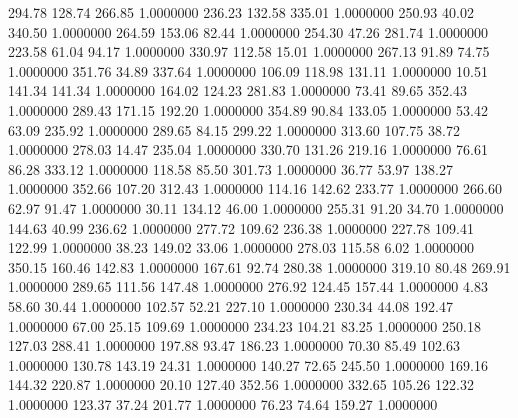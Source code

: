  294.78  128.74  266.85   1.0000000
 236.23  132.58  335.01   1.0000000
 250.93   40.02  340.50   1.0000000
 264.59  153.06   82.44   1.0000000
 254.30   47.26  281.74   1.0000000
 223.58   61.04   94.17   1.0000000
 330.97  112.58   15.01   1.0000000
 267.13   91.89   74.75   1.0000000
 351.76   34.89  337.64   1.0000000
 106.09  118.98  131.11   1.0000000
  10.51  141.34  141.34   1.0000000
 164.02  124.23  281.83   1.0000000
  73.41   89.65  352.43   1.0000000
 289.43  171.15  192.20   1.0000000
 354.89   90.84  133.05   1.0000000
  53.42   63.09  235.92   1.0000000
 289.65   84.15  299.22   1.0000000
 313.60  107.75   38.72   1.0000000
 278.03   14.47  235.04   1.0000000
 330.70  131.26  219.16   1.0000000
  76.61   86.28  333.12   1.0000000
 118.58   85.50  301.73   1.0000000
  36.77   53.97  138.27   1.0000000
 352.66  107.20  312.43   1.0000000
 114.16  142.62  233.77   1.0000000
 266.60   62.97   91.47   1.0000000
  30.11  134.12   46.00   1.0000000
 255.31   91.20   34.70   1.0000000
 144.63   40.99  236.62   1.0000000
 277.72  109.62  236.38   1.0000000
 227.78  109.41  122.99   1.0000000
  38.23  149.02   33.06   1.0000000
 278.03  115.58    6.02   1.0000000
 350.15  160.46  142.83   1.0000000
 167.61   92.74  280.38   1.0000000
 319.10   80.48  269.91   1.0000000
 289.65  111.56  147.48   1.0000000
 276.92  124.45  157.44   1.0000000
   4.83   58.60   30.44   1.0000000
 102.57   52.21  227.10   1.0000000
 230.34   44.08  192.47   1.0000000
  67.00   25.15  109.69   1.0000000
 234.23  104.21   83.25   1.0000000
 250.18  127.03  288.41   1.0000000
 197.88   93.47  186.23   1.0000000
  70.30   85.49  102.63   1.0000000
 130.78  143.19   24.31   1.0000000
 140.27   72.65  245.50   1.0000000
 169.16  144.32  220.87   1.0000000
  20.10  127.40  352.56   1.0000000
 332.65  105.26  122.32   1.0000000
 123.37   37.24  201.77   1.0000000
  76.23   74.64  159.27   1.0000000
